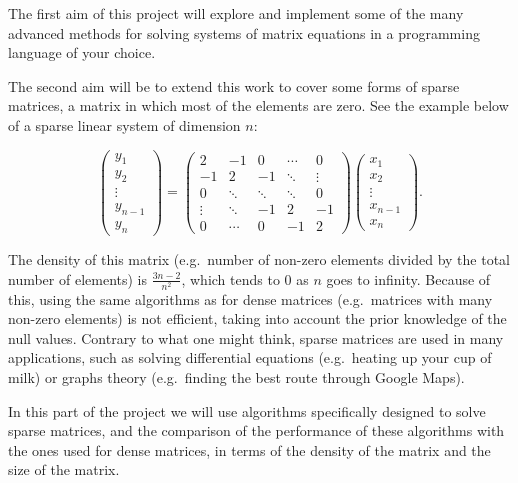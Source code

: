\documentclass{article}
\begin{document}
The first aim of this project will explore and implement some of the many advanced methods for solving systems of matrix equations in a programming language of your choice.

The second aim will be to extend this work to cover some forms of sparse matrices, a matrix in which most of the elements are zero. See the example below of a sparse linear system of dimension $n$:

\begin{equation*}
	\begin{pmatrix}
		y_1     \\
		y_2     \\
		\vdots  \\
		y_{n-1} \\
		y_n
	\end{pmatrix} =
	\begin{pmatrix}
		2      & -1     & 0      & \cdots & 0      \\
		-1     & 2      & -1     & \ddots & \vdots \\
		0      & \ddots & \ddots & \ddots & 0      \\
		\vdots & \ddots & -1     & 2      & -1     \\
		0      & \cdots & 0      & -1     & 2
	\end{pmatrix}
	\begin{pmatrix}
		x_1     \\
		x_2     \\
		\vdots  \\
		x_{n-1} \\
		x_n
	\end{pmatrix}.
\end{equation*}

The density of this matrix (e.g.\ number of non-zero elements divided by the total number of elements) is $\frac{3n-2}{n^2}$, which tends to $0$ as $n$ goes to infinity. Because of this, using the same algorithms as for dense matrices (e.g.\ matrices with many non-zero elements) is not efficient, taking into account the prior knowledge of the null values. Contrary to what one might think, sparse matrices are used in many applications, such as solving differential equations (e.g.\ heating up your cup of milk) or graphs theory (e.g.\ finding the best route through Google Maps).

In this part of the project we will use algorithms specifically designed to solve sparse matrices, and the comparison of the performance of these algorithms with the ones used for dense matrices, in terms of the density of the matrix and the size of the matrix.
\end{document}
